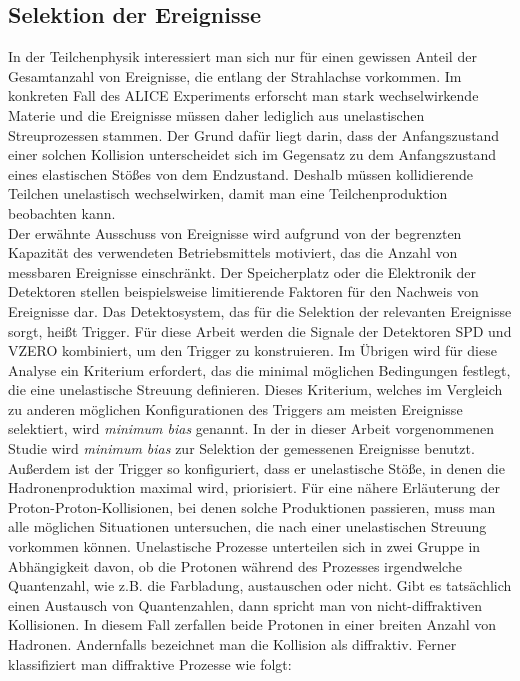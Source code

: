 \documentclass[12pt,a4paper]{report}
\begin{document}
\subsection{Selektion der Ereignisse}
In der Teilchenphysik interessiert man sich nur für einen gewissen Anteil der Gesamtanzahl von Ereignisse, die entlang der Strahlachse vorkommen. Im konkreten Fall des ALICE Experiments erforscht man stark wechselwirkende Materie und die Ereignisse müssen daher lediglich aus unelastischen Streuprozessen stammen. Der Grund dafür liegt darin, dass der Anfangszustand einer solchen Kollision unterscheidet sich im Gegensatz zu dem Anfangszustand eines elastischen Stößes von dem Endzustand. Deshalb müssen kollidierende Teilchen unelastisch wechselwirken, damit man eine Teilchenproduktion beobachten kann.\\
Der erwähnte Ausschuss von Ereignisse wird aufgrund von der begrenzten Kapazität des verwendeten Betriebsmittels motiviert, das die Anzahl von messbaren Ereignisse einschränkt. Der Speicherplatz oder die Elektronik der Detektoren stellen beispielsweise limitierende Faktoren für den Nachweis von Ereignisse dar. Das Detektosystem, das für die Selektion der relevanten Ereignisse sorgt, heißt Trigger. Für diese Arbeit werden die Signale der Detektoren SPD und VZERO kombiniert, um den Trigger zu konstruieren. Im Übrigen wird für diese Analyse ein Kriterium erfordert, das die minimal möglichen Bedingungen festlegt, die eine unelastische Streuung definieren. Dieses Kriterium, welches im Vergleich zu anderen möglichen Konfigurationen des Triggers am meisten Ereignisse selektiert, wird \textit{minimum bias} genannt. In der in dieser Arbeit vorgenommenen Studie wird \textit{minimum bias} zur Selektion der gemessenen Ereignisse benutzt.\\
Außerdem ist der Trigger so konfiguriert, dass er unelastische Stöße, in denen die Hadronenproduktion maximal wird, priorisiert.
Für eine nähere Erläuterung der Proton-Proton-Kollisionen, bei denen solche Produktionen passieren, muss man alle möglichen Situationen untersuchen, die nach einer unelastischen Streuung vorkommen können. Unelastische Prozesse unterteilen sich in zwei Gruppe in Abhängigkeit davon, ob die Protonen während des Prozesses irgendwelche Quantenzahl, wie z.B. die Farbladung, austauschen oder nicht. Gibt es tatsächlich einen Austausch von Quantenzahlen, dann spricht man von nicht-diffraktiven Kollisionen. In diesem Fall zerfallen beide Protonen in einer breiten Anzahl von Hadronen. Andernfalls bezeichnet man die Kollision als diffraktiv. Ferner klassifiziert man diffraktive Prozesse wie folgt:
\end{document}
